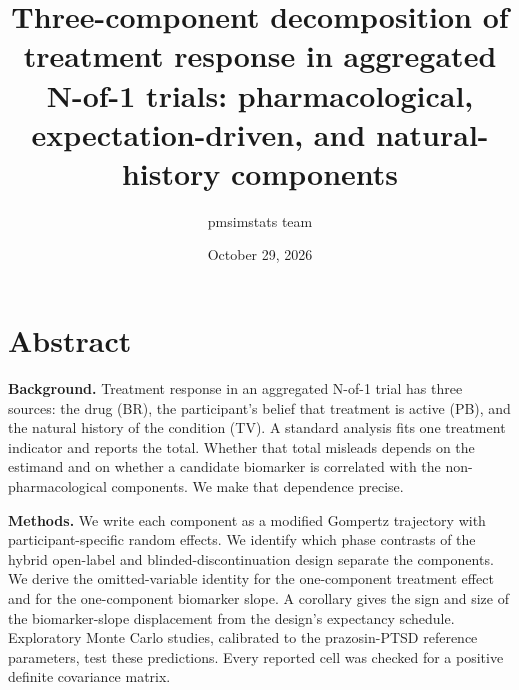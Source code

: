 \documentclass[
  11pt,
]{article}
\title{Three-component decomposition of treatment response in aggregated N-of-1 trials: pharmacological, expectation-driven, and natural-history components}
\author{pmsimstats team}
\date{October 29, 2026}
\begin{document}
\maketitle

{
\setcounter{tocdepth}{2}
\tableofcontents
}
\section*{Abstract}\label{abstract}

\textbf{Background.} Treatment response in an aggregated N-of-1 trial has
three sources: the drug (BR), the participant's belief that treatment
is active (PB), and the natural history of the condition (TV). A
standard analysis fits one treatment indicator and reports the total.
Whether that total misleads depends on the estimand and on whether a
candidate biomarker is correlated with the non-pharmacological
components. We make that dependence precise.

\textbf{Methods.} We write each component as a modified Gompertz trajectory
with participant-specific random effects. We identify which phase
contrasts of the hybrid open-label and blinded-discontinuation design
separate the components. We derive the omitted-variable identity for the
one-component treatment effect and for the one-component biomarker
slope. A corollary gives the sign and size of the biomarker-slope
displacement from the design's expectancy schedule. Exploratory Monte
Carlo studies, calibrated to the prazosin-PTSD reference parameters,
test these predictions. Every reported cell was checked for a positive
definite covariance matrix.
\end{document}
